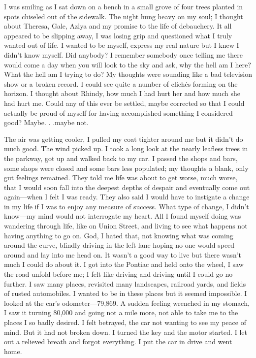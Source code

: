 I was smiling as I sat down on a bench in a small grove of four trees
planted in spots chiseled out of the sidewalk. The night hung heavy on
my soul; I thought about Theresa, Gale, Azlya and my promise to the life
of debauchery. It all appeared to be slipping away, I was losing grip
and questioned what I truly wanted out of life. I wanted to be myself,
express my real nature but I knew I didn't know myself. Did anybody? I
remember somebody once telling me there would come a day when you will
look to the sky and ask, why the hell am I here? What the hell am I
trying to do? My thoughts were sounding like a bad television show or a
broken record. I could see quite a number of clichés forming on the
horizon. I thought about Rhindy, how much I had hurt her and how much
she had hurt me. Could any of this ever be settled, maybe corrected so
that I could actually be proud of myself for having accomplished
something I considered good? Maybe. . .maybe not.

The air was getting cooler, I pulled my coat tighter around me but it
didn't do much good. The wind picked up. I took a long look at the
nearly leafless trees in the parkway, got up and walked back to my car.
I passed the shops and bars, some shops were closed and some bars less
populated; my thoughts a blank, only gut feelings remained. They told me
life was about to get worse, much worse, that I would soon fall into the
deepest depths of despair and eventually come out again---when I felt I
was ready. They also said I would have to instigate a change in my life
if I was to enjoy any measure of success. What type of change, I didn't
know---my mind would not interrogate my heart. All I found myself doing
was wandering through life, like on Union Street, and living to see what
happens not having anything to go on. God, I hated that, not knowing
what was coming around the curve, blindly driving in the left lane
hoping no one would speed around and lay into me head on. It wasn't a
good way to live but there wasn't much I could do about it. I got into
the Pontiac and held onto the wheel, I saw the road unfold before me; I
felt like driving and driving until I could go no further. I saw many
places, revisited many landscapes, railroad yards, and fields of rusted
automobiles. I wanted to be in these places but it seemed impossible. I
looked at the car's odometer---79,869. A sudden feeling wrenched in my
stomach, I saw it turning 80,000 and going not a mile more, not able to
take me to the places I so badly desired. I felt betrayed, the car not
wanting to see my peace of mind. But it had not broken down. I turned
the key and the motor started. I let out a relieved breath and forgot
everything. I put the car in drive and went home.

